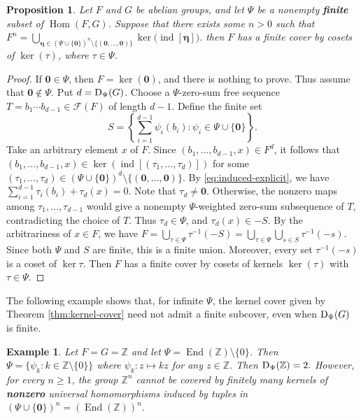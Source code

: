 \documentclass[a4paper, 12pt]{article}
\newtheorem{prop}[theorem]{Proposition}
\newtheorem{exam}[theorem]{Example}
\begin{document}
\begin{prop}\label{cor:finite-coset-cover}
Let $F$ and $G$ be abelian groups, and let $\Psi$ be a nonempty
{\bf finite} subset of $\operatorname{Hom}(F,G)$. Suppose that there exists some $n>0$ such that $F^n=\bigcup_{\boldsymbol{\eta}\in
      (\Psi\cup\{\mathbf 0\})^n\setminus\{(\mathbf 0,\ldots,\mathbf 0)\}}
    \ker\bigl(\operatorname{ind}[\boldsymbol{\eta}]\bigr).$  then $F$ has a finite cover by cosets of $\ker(\tau)$,
where $\tau\in\Psi$.
\end{prop}

\begin{proof}
If $\mathbf 0\in\Psi$, then $F=\ker(\mathbf 0)$, and there is nothing
to prove. Thus assume that $\mathbf 0\notin\Psi$. Put
$d={\rm D}_{\Psi}(G)$.
Choose a $\Psi$-zero-sum free sequence
$T=b_1\cdots b_{d-1}\in \mathcal F(F)$ of length $d-1$.  Define the finite set
$$S=
\left\{
\sum_{i=1}^{d-1}\psi_i(b_i):
\psi_i\in\Psi\cup\{\mathbf 0\}
\right\}.$$
Take an arbitrary element $x$ of $F$. Since $(b_1,\ldots,b_{d-1},x)\in F^d$, it follows that
$(b_1,\ldots,b_{d-1},x)\in \ker(\operatorname{ind}[(\tau_1,\ldots,\tau_d)])$
for some
$(\tau_1,\ldots,\tau_d)
\in(\Psi\cup\{\mathbf 0\})^d
\setminus\{(\mathbf 0,\ldots,\mathbf 0)\}.$ By \eqref{eq:induced-explicit}, we have
$\sum_{i=1}^{d-1}\tau_i(b_i)+\tau_d(x)=0.$
Note that $\tau_d\neq\mathbf 0$. Otherwise, the nonzero maps among
$\tau_1,\ldots,\tau_{d-1}$ would give a nonempty
$\Psi$-weighted zero-sum subsequence of $T$, contradicting the choice
of $T$. Thus $\tau_d\in\Psi$, and $\tau_d(x)\in -S.$ By the arbitrariness of $x\in F$, we have $F=\bigcup\limits_{\tau\in\Psi}\tau^{-1}(-S)=\bigcup\limits_{\tau\in\Psi}\bigcup\limits_{s\in S}\tau^{-1}(-s)$.
Since both $\Psi$ and $S$ are finite, this is a finite union.
Moreover, every set $\tau^{-1}(-s)$ is a coset of
$\ker\tau$.  Then $F$ has a finite cover by cosets of kernels $\ker(\tau)$ with
$\tau\in\Psi$.
\end{proof}

The following example shows that, for infinite $\Psi$, the kernel
cover given by Theorem \ref{thm:kernel-cover} need not admit a finite subcover, even when
${\rm D}_{\Psi}(G)$ is finite.


\begin{exam}\label{ex:no-finite-kernel-subcover}
Let $F=G=\mathbb Z$
and let $\Psi=\operatorname{End}(\mathbb Z)\setminus\{0\}$. Then $\Psi=\{\psi_k:k\in\mathbb Z\setminus\{0\}\}$
where $\psi_k:z\mapsto kz$ for any $z\in \mathbb{Z}$. Then
${\rm D}_{\Psi}(\mathbb Z)=2.$
However, for every $n\ge 1$, the group $\mathbb Z^n$ cannot be
covered by finitely many kernels of {\bf nonzero} universal homomorphisms
induced by tuples in
$(\Psi\cup\{\mathbf 0\})^n=(\operatorname{End}(\mathbb Z))^n.$
\end{exam}
\end{document}
